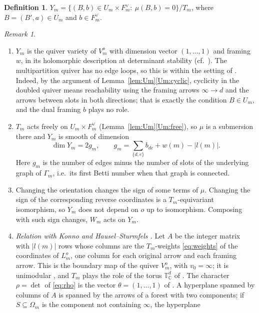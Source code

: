 \documentclass[11pt]{amsart}
\theoremstyle{definition}
\newtheorem{definition}[theorem]{Definition}
\theoremstyle{remark}
\newtheorem{remark}[theorem]{Remark}
\numberwithin{equation}{section}
\newcommand{\C}{\mathbb{C}}
\newcommand{\Om}{\Omega_m}
\begin{document}
\begin{definition}\label{def:Ym}
$Y_m=\{(B,b)\in U_m\times F_m^\vee:\ \mu(B,b)=0\}/T_m$, where $B=(B',a)\in U_m$ and $b\in F_m^\vee$.
\end{definition}

\begin{remark}\label{rem:Ym}
\begin{enumerate}[label=(\roman*),leftmargin=2em]
\item\label{it:qv} $Y_m$ is the quiver variety \cite{Nak} of $V^o_m$ with dimension vector $(1,\dots,1)$
and framing $w$, in its holomorphic description at determinant stability (cf.\
\cite[Theorem~3.2, Proposition~3.5]{Nak}). The multipartition quiver has no edge loops, so this is within
the setting of \cite{Nak}. Indeed, by the argument of Lemma~\ref{lem:Um}\ref{Um:cyclic}, cyclicity in the
doubled quiver means reachability using the framing arrows $\infty\to d$ and the arrows between slots in
both directions; that is exactly the condition $B\in U_m$, and the dual framing $b$ plays no role.
\item\label{it:dim} $T_m$ acts freely on $U_m\times F_m^\vee$ (Lemma~\ref{lem:Um}\ref{Um:free}), so
$\mu$ is a submersion there and $Y_m$ is smooth of dimension
\[
  \dim Y_m=2g_m,\qquad g_m=\sum_{\{d,e\}}b_{de}+w(m)-|l(m)|.
\]
Here $g_m$ is the number of edges minus the number of slots of the underlying graph of $\Gamma_m$, i.e.\
its first Betti number when that graph is connected.
\item\label{it:orient} Changing the orientation changes the sign of some terms of $\mu$. Changing the
sign of the corresponding reverse coordinates is a $T_m$-equivariant isomorphism, so $Y_m$ does not depend
on $o$ up to isomorphism. Composing with such sign changes, $W_m$ acts on $Y_m$.
\item\label{it:HS} \emph{Relation with Konno \cite{Kon00,Kon01} and Hausel--Sturmfels \cite{HS}.} Let $A$ be the integer matrix with
$|l(m)|$ rows whose columns are the $T_m$-weights \eqref{eq:weights} of the coordinates of $L^o_m$, one
column for each original arrow and each framing arrow. This is the boundary map \cite[(40)]{HS} of the
quiver $V^o_m$, with $v_0=\infty$; it is unimodular \cite[Lemma~8.1]{HS}, and $T_m$ plays the role of the
torus $\mathbb T^d_\C$ of \cite{HS}. The character $\rho=\det$ of \eqref{eq:rho} is the vector
$\theta=(1,\dots,1)$ of \cite{HS}. A hyperplane spanned by columns of $A$ is spanned by the arrows of a
forest with two components; if $S\subseteq\Om$ is the component not containing $\infty$, the hyperplane

\end{enumerate}
\end{remark}
\end{document}
